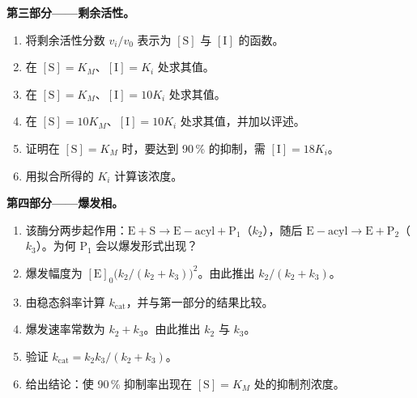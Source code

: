 \begin{problem}
\medskip\noindent\textbf{第三部分——剩余活性。}
\begin{enumerate}[resume]
  \item 将剩余活性分数 $v_i/v_0$ 表示为 $[\mathrm S]$ 与 
        $[\mathrm I]$ 的函数。
  \item 在 $[\mathrm S] = K_M$、$[\mathrm I] = K_i$ 处求其值。
  \item 在 $[\mathrm S] = K_M$、$[\mathrm I] = 10K_i$ 处求其值。
  \item 在 $[\mathrm S] = 10K_M$、$[\mathrm I] = 10K_i$ 处求其值，并加以评述。
  \item 证明在 $[\mathrm S] = K_M$ 时，要达到 90\,\% 的抑制，需 $[\mathrm I] = 18K_i$。
  \item 用拟合所得的 $K_i$ 计算该浓度。
\end{enumerate}

\medskip\noindent\textbf{第四部分——爆发相。}
\begin{enumerate}[resume]
  \item 该酶分两步起作用：$\mathrm{E + S \to E{-}acyl + P_1}$（$k_2$），随后 $\mathrm{E{-}acyl \to E +
        P_2}$（$k_3$）。为何 $\mathrm P_1$ 会以爆发形式出现？
  \item 爆发幅度为 $[\mathrm E]_0\bigl(k_2/(k_2 + k_3)\bigr)^2$。由此推出 $k_2/(k_2 + k_3)$。
  \item 由稳态斜率计算 $k_{\mathrm{cat}}$，并与第一部分的结果比较。
  \item 爆发速率常数为 $k_2 + k_3$。由此推出 $k_2$ 与 $k_3$。
  \item 验证 $k_{\mathrm{cat}} = k_2k_3/(k_2 + k_3)$。
  \item 给出结论：使 90\,\% 抑制率出现在
        $[\mathrm S] = K_M$ 处的抑制剂浓度。
\end{enumerate}
\end{problem}
